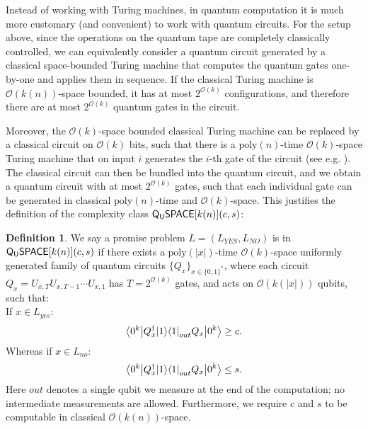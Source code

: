 \documentclass[11pt]{article}
\theoremstyle{definition}
\newtheorem{definition}[theorem]{Definition}
\theoremstyle{remark}
\newcommand\QSPACE{{\sf{Q_{U}SPACE}}}
\newcommand\bigoh{\mathcal{O}}
\newcommand{\poly}{\textrm{poly}}
\begin{document}
Instead of working with Turing machines, in quantum computation it is much more customary (and convenient) to work with quantum circuits. For the setup above, since the operations on the quantum tape are completely classically controlled, we can equivalently consider a quantum circuit generated by a classical space-bounded Turing machine that computes the quantum gates one-by-one and applies them in sequence. If the classical Turing machine is $\mathcal{O}(k(n))$-space bounded, it has at most $2^{\mathcal{O}(k)}$ configurations, and therefore there are at most $2^{\mathcal{O}(k)}$ quantum gates in the circuit. 

Moreover, the $\mathcal{O}(k)$-space bounded classical Turing machine can be replaced by a classical circuit on $\mathcal{O}(k)$ bits, such that there is a $\poly(n)$-time $\mathcal{O}(k)$-space Turing machine that on input $i$ generates the $i$-th gate of the circuit (see e.g. \cite[Section~6.8]{ab09}). The classical circuit can then be bundled into the quantum circuit, and we obtain a quantum circuit with at most $2^{\mathcal{O}(k)}$ gates, such that each individual gate can be generated in classical $\poly(n)$-time and $\mathcal{O}(k)$-space. This justifies the definition of the complexity class $\QSPACE[k(n)](c,s)$:

\begingroup
\def\thedefinition{\ref{def: qspace}}
\begin{definition}
We say a promise problem $L=(L_{YES},L_{NO})$ is in $\QSPACE[k(n)](c,s)$ if there exists a $\poly(|x|)$-time $\mathcal{O}(k)$-space uniformly generated family of quantum circuits $\{Q_x\}_{x\in\{0,1\}^*}$, where each circuit $Q_x=U_{x,T}U_{x,T-1}\cdots U_{x,1}$ has $T=2^{\mathcal{O}(k)}$ gates, and acts on $\mathcal{O}(k(|x|))$ qubits, such that:\\
 If $x \in L_{yes}$:
\begin{equation}
{\left\langle{0^k}\right\vert} Q^\dagger_x {\left\vert{1}\right\rangle}{\left\langle{1}\right\vert}_{out} Q_x {\left\vert{0^k}\right\rangle} \ge c.
\end{equation}
Whereas if $x \in L_{no}$:
\begin{equation}
{\left\langle{0^k}\right\vert} Q^\dagger_x {\left\vert{1}\right\rangle}{\left\langle{1}\right\vert}_{out} Q_x {\left\vert{0^k}\right\rangle} \le s.
\end{equation}
Here $out$ denotes a single qubit we measure at the end of the computation; no intermediate measurements are allowed.  
Furthermore, we require $c$ and $s$ to be computable in classical $\bigoh(k(n))$-space.
\end{definition}
\addtocounter{theorem}{-1}
\endgroup
\end{document}
